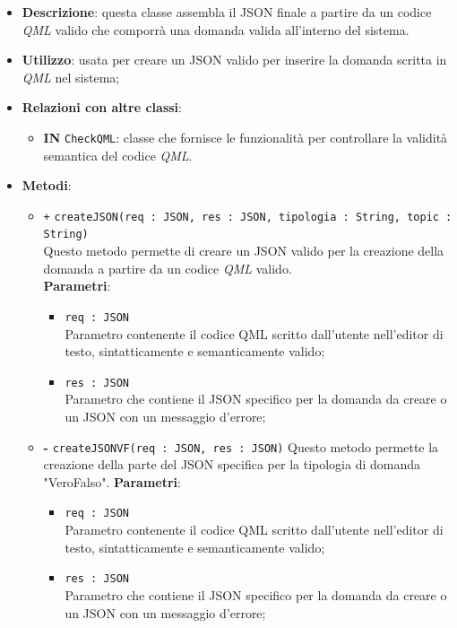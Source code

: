 \begin{itemize}
	\item \textbf{Descrizione}: questa classe assembla il JSON finale a partire da un codice \textit{QML} valido che comporrà una domanda valida all'interno del sistema.
	\item \textbf{Utilizzo}: usata per creare un JSON valido per inserire la domanda scritta in \textit{QML} nel sistema;
	\item \textbf{Relazioni con altre classi}:
	\begin{itemize}
		\item \textbf{IN} \texttt{CheckQML}: classe che fornisce le funzionalità per controllare la validità semantica del codice \textit{QML}.
	\end{itemize}
	\item \textbf{Metodi}:
	\begin{itemize}
		\item \texttt{+} \texttt{createJSON(req : JSON, res : JSON, tipologia : String, topic : String)} \\
		Questo metodo permette di creare un JSON valido per la creazione della domanda a partire da un codice \textit{QML} valido. \\
		\textbf{Parametri}:
		\begin{itemize}
			\item \texttt{req : JSON} \\
			Parametro contenente il codice QML scritto dall'utente nell'editor di testo, sintatticamente e semanticamente valido;
			\item \texttt{res : JSON} \\
			Parametro che contiene il JSON specifico per la domanda da creare o un JSON con un messaggio d'errore;
		\end{itemize}
		\item \textbf{-} \texttt{createJSONVF(req : JSON, res : JSON)}
		Questo metodo permette la creazione della parte del JSON specifica per la tipologia di domanda "VeroFalso".
		\textbf{Parametri}:
		\begin{itemize}
			\item \texttt{req : JSON} \\
			Parametro contenente il codice QML scritto dall'utente nell'editor di testo, sintatticamente e semanticamente valido;
			\item \texttt{res : JSON} \\
			Parametro che contiene il JSON specifico per la domanda da creare o un JSON con un messaggio d'errore;

\end{itemize}
\end{itemize}
\end{itemize}
